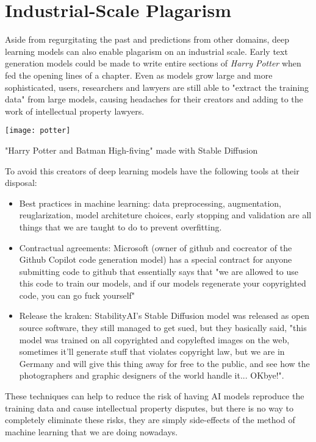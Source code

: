 \section{Industrial-Scale Plagarism}

Aside from regurgitating the past and predictions from other domains, deep learning models can also enable plagarism on an industrial scale. Early text generation models could be made to write entire sections of \textit{Harry Potter} when fed the opening lines of a chapter. Even as models grow large and more sophisticated, users, researchers and lawyers are still able to "extract the training data"  from large models, causing headaches for their creators and adding to the work of intellectual property lawyers. 

\begin{marginfigure}[-5.5cm]
        \texttt{[image: potter]}
        \caption{"Harry Potter and Batman High-fiving" made with Stable Diffusion}
\end{marginfigure}


To avoid this creators of deep learning models have the following tools at their disposal:

\begin{itemize}
\item Best practices in  machine learning: data preprocessing, augmentation, reuglarization, model architeture choices, early stopping and validation are all things that we are taught to do to prevent overfitting.
\item Contractual agreements: Microsoft (owner of github and cocreator of the Github Copilot code generation model) has a special contract for anyone submitting code to github that essentially says that "we are allowed to use this code to train our models, and if our models regenerate your copyrighted code, you can go fuck yourself"
\item Release the kraken: StabilityAI's Stable Diffusion model was released as open source software, they still managed to get sued, but they basically said, "this model was trained on all copyrighted and copylefted images on the web, sometimes it'll generate stuff that violates copyright law, but we are in Germany and will give this thing away for free to the public, and see how the photographers and graphic designers of the world handle it... OKbye!". 
\end{itemize}

These techniques can help to reduce the risk of having AI models reproduce the training data and cause intellectual property disputes, but there is no way to completely eliminate these risks, they are simply side-effects of the method of machine learning that we are doing nowadays.

